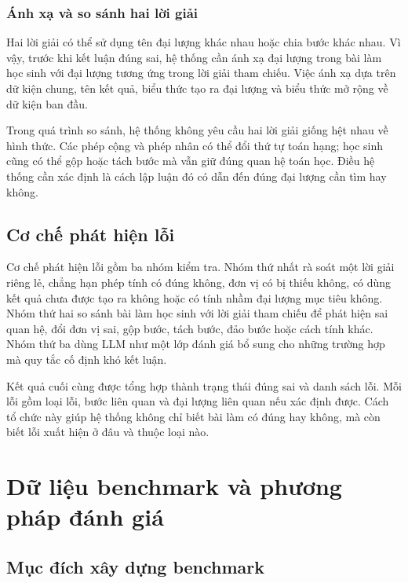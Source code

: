 \documentclass[12pt,a4paper]{article}
\begin{document}
\subsubsection{Ánh xạ và so sánh hai lời giải}

Hai lời giải có thể sử dụng tên đại lượng khác nhau hoặc chia bước khác nhau.
Vì vậy, trước khi kết luận đúng sai, hệ thống cần ánh xạ đại lượng trong bài làm
học sinh với đại lượng tương ứng trong lời giải tham chiếu. Việc ánh xạ dựa
trên dữ kiện chung, tên kết quả, biểu thức tạo ra đại lượng và biểu thức mở
rộng về dữ kiện ban đầu.

Trong quá trình so sánh, hệ thống không yêu cầu hai lời giải giống hệt nhau về
hình thức. Các phép cộng và phép nhân có thể đổi thứ tự toán hạng; học sinh cũng
có thể gộp hoặc tách bước mà vẫn giữ đúng quan hệ toán học. Điều hệ thống cần
xác định là cách lập luận đó có dẫn đến đúng đại lượng cần tìm hay không.

\subsection{Cơ chế phát hiện lỗi}

Cơ chế phát hiện lỗi gồm ba nhóm kiểm tra. Nhóm thứ nhất rà soát một lời giải
riêng lẻ, chẳng hạn phép tính có đúng không, đơn vị có bị thiếu không, có dùng
kết quả chưa được tạo ra không hoặc có tính nhầm đại lượng mục tiêu không. Nhóm
thứ hai so sánh bài làm học sinh với lời giải tham chiếu để phát hiện sai quan
hệ, đổi đơn vị sai, gộp bước, tách bước, đảo bước hoặc cách tính khác. Nhóm thứ
ba dùng LLM như một lớp đánh giá bổ sung cho những trường hợp mà quy tắc cố định
khó kết luận.

Kết quả cuối cùng được tổng hợp thành trạng thái đúng sai và danh sách lỗi. Mỗi
lỗi gồm loại lỗi, bước liên quan và đại lượng liên quan nếu xác định được. Cách
tổ chức này giúp hệ thống không chỉ biết bài làm có đúng hay không, mà còn biết
lỗi xuất hiện ở đâu và thuộc loại nào.

\section{Dữ liệu benchmark và phương pháp đánh giá}

\subsection{Mục đích xây dựng benchmark}
\end{document}

